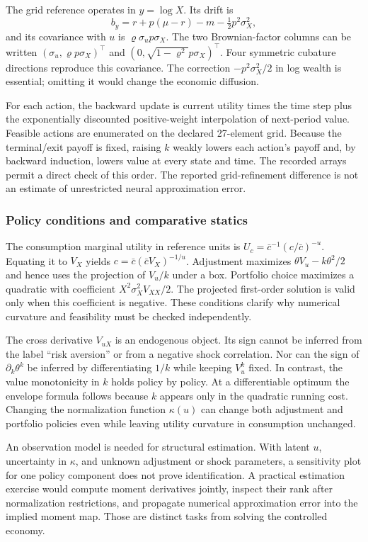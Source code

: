 The grid reference operates in $y=\log X$. Its drift is
\[
 b_y=r+p(\mu-r)-m-\tfrac12p^2\sigma_X^2,
\]
and its covariance with $u$ is $\varrho\sigma_u p\sigma_X$. The two Brownian-factor columns can be written $(\sigma_u,\varrho p\sigma_X)^\top$ and $(0,\sqrt{1-\varrho^2}p\sigma_X)^\top$. Four symmetric cubature directions reproduce this covariance. The correction $-p^2\sigma_X^2/2$ in log wealth is essential; omitting it would change the economic diffusion.

For each action, the backward update is current utility times the time step plus the exponentially discounted positive-weight interpolation of next-period value. Feasible actions are enumerated on the declared 27-element grid. Because the terminal/exit payoff is fixed, raising $k$ weakly lowers each action's payoff and, by backward induction, lowers value at every state and time. The recorded arrays permit a direct check of this order. The reported grid-refinement difference is not an estimate of unrestricted neural approximation error.

\subsubsection{Policy conditions and comparative statics}
The consumption marginal utility in reference units is $U_c=\bar c^{-1}(c/\bar c)^{-u}$. Equating it to $V_X$ yields $c=\bar c(\bar cV_X)^{-1/u}$. Adjustment maximizes $\theta V_u-k\theta^2/2$ and hence uses the projection of $V_u/k$ under a box. Portfolio choice maximizes a quadratic with coefficient $X^2\sigma_X^2V_{XX}/2$. The projected first-order solution is valid only when this coefficient is negative. These conditions clarify why numerical curvature and feasibility must be checked independently.

The cross derivative $V_{uX}$ is an endogenous object. Its sign cannot be inferred from the label ``risk aversion'' or from a negative shock correlation. Nor can the sign of $\partial_k\theta^k$ be inferred by differentiating $1/k$ while keeping $V_u^k$ fixed. In contrast, the value monotonicity in $k$ holds policy by policy. At a differentiable optimum the envelope formula follows because $k$ appears only in the quadratic running cost. Changing the normalization function $\kappa(u)$ can change both adjustment and portfolio policies even while leaving utility curvature in consumption unchanged.

An observation model is needed for structural estimation. With latent $u$, uncertainty in $\kappa$, and unknown adjustment or shock parameters, a sensitivity plot for one policy component does not prove identification. A practical estimation exercise would compute moment derivatives jointly, inspect their rank after normalization restrictions, and propagate numerical approximation error into the implied moment map. Those are distinct tasks from solving the controlled economy.

